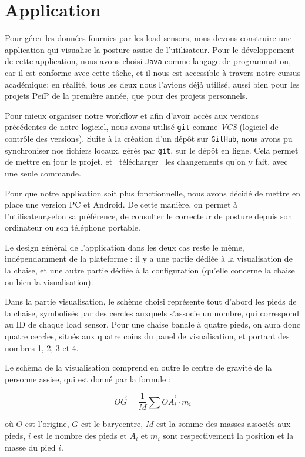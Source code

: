 \documentclass{polytech/polytech}
\begin{document}
\chapter{Application}
\label{chap:Application}

Pour gérer les données fournies par les load sensors, nous devons construire une application qui visualise la posture assise de l'utilisateur. Pour le développement de cette application, nous avons choisi \texttt{Java} comme langage de programmation, car il est conforme avec cette tâche, et il nous est accessible à travers notre cursus académique; en réalité, tous les deux nous l'avions déjà utilisé, aussi bien pour les projets PeiP de la première année, que pour des projets personnels.

Pour mieux organiser notre workflow et afin d'avoir accès aux versions précédentes de notre logiciel, nous avons utilisé \texttt{git} comme \textit{VCS} (logiciel de contrôle des versions). Suite à la création d'un dépôt sur \texttt{GitHub}, nous avons pu synchroniser nos fichiers locaux, gérés par \texttt{git}, sur le dépôt en ligne. Cela permet de mettre en jour le projet, et \guillemotleft\ télécharger \guillemotright\ les changements qu'on y fait, avec une seule commande.

Pour que notre application soit plus fonctionnelle, nous avons décidé de mettre en place une version PC et Android. De cette manière, on permet à l'utilisateur,selon sa préférence, de consulter le correcteur de posture depuis son ordinateur ou son téléphone portable.

Le design général de l'application dans les deux cas reste le même, indépendamment de la plateforme : il y a une partie dédiée à la visualisation de la chaise, et une autre partie dédiée à la configuration (qu'elle concerne la chaise ou bien la visualisation). 

Dans la partie visualisation, le schème choisi représente tout d'abord les pieds de la chaise, symbolisés par des cercles auxquels s'associe un nombre, qui correspond au ID de chaque load sensor. Pour une chaise banale à quatre pieds, on aura donc quatre cercles, situés aux quatre coins du panel de visualisation, et portant des nombres 1, 2, 3 et 4. 

Le schèma de la visualisation comprend en outre le centre de gravité de la personne assise, qui est donné par la formule :

$$\vec{OG} = \frac{1}{M} \sum \vec{OA_i} \cdot m_i$$

où $O$ est l'origine, $G$ est le barycentre, $M$ est la somme des masses associés aux pieds, $i$ est le nombre des pieds et $A_i$ et $m_i$ sont respectivement la position et la masse du pied $i$.
\end{document}
